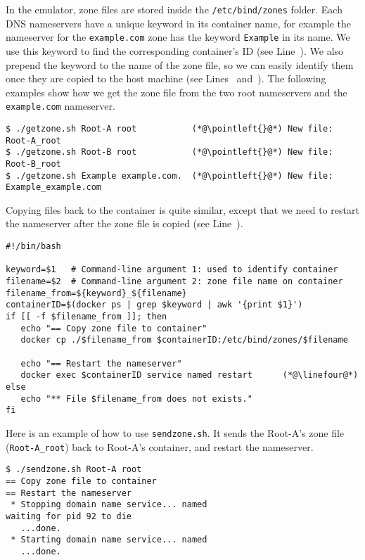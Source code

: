 In the emulator, zone files are stored inside the \texttt{/etc/bind/zones} folder.  
Each DNS nameservers have a unique keyword in its container name, for example
the nameserver for the \texttt{example.com} zone has the keyword \texttt{Example}
in its name. We use this keyword to find the corresponding container's ID (see
Line~\linetwo). We also prepend the keyword to the name of the zone file, so we can
easily identify them once they are copied to the host machine (see Lines~\lineone
and~\linethree). The following examples show how we get the zone file from
the two root nameservers and the \texttt{example.com} nameserver.  


\begin{lstlisting}
$ ./getzone.sh Root-A root           (*@\pointleft{}@*) New file: Root-A_root
$ ./getzone.sh Root-B root           (*@\pointleft{}@*) New file: Root-B_root
$ ./getzone.sh Example example.com.  (*@\pointleft{}@*) New file: Example_example.com
\end{lstlisting}
 

Copying files back to  the container is quite similar, except that 
we need to restart the nameserver after the zone file is copied (see Line~\linefour).

\begin{lstlisting}[caption=Sending the zone file to container: \texttt{sendzone.sh}]
#!/bin/bash

keyword=$1   # Command-line argument 1: used to identify container
filename=$2  # Command-line argument 2: zone file name on container
filename_from=${keyword}_${filename}
containerID=$(docker ps | grep $keyword | awk '{print $1}')
if [[ -f $filename_from ]]; then
   echo "== Copy zone file to container"
   docker cp ./$filename_from $containerID:/etc/bind/zones/$filename

   echo "== Restart the nameserver"
   docker exec $containerID service named restart      (*@\linefour@*) 
else
   echo "** File $filename_from does not exists."
fi
\end{lstlisting}
 
Here is an example of how to use \texttt{sendzone.sh}. It sends the 
Root-A's zone file (\texttt{Root-A\_root}) back to Root-A's container,
and restart the nameserver.

\begin{lstlisting}
$ ./sendzone.sh Root-A root
== Copy zone file to container
== Restart the nameserver
 * Stopping domain name service... named
waiting for pid 92 to die
   ...done.
 * Starting domain name service... named
   ...done.
\end{lstlisting}



